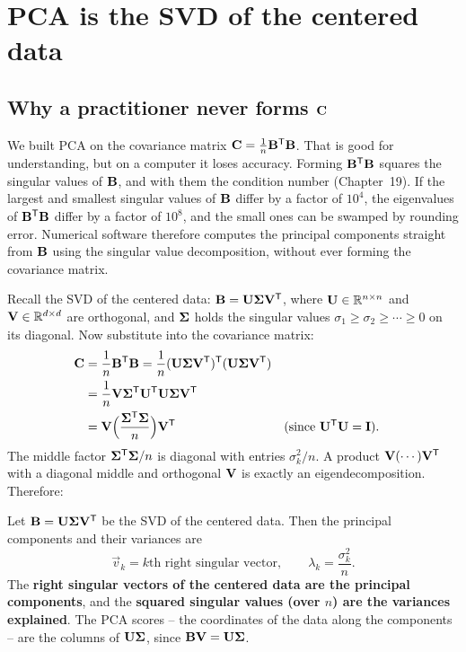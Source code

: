 \section{PCA is the SVD of the centered data}

\subsection{Why a practitioner never forms $\mathbf{C}$}

We built PCA on the covariance matrix $\mathbf{C}=\tfrac1n\mathbf{B}^{\mathsf{T}}\mathbf{B}$. That is
good for understanding, but on a computer it loses accuracy. Forming $\mathbf{B}^{\mathsf{T}}\mathbf{B}$
squares the singular values of $\mathbf{B}$, and with them the condition number
(Chapter~19). If the largest and smallest singular values of $\mathbf{B}$ differ by a
factor of $10^4$, the eigenvalues of $\mathbf{B}^{\mathsf{T}}\mathbf{B}$ differ by a factor of $10^8$,
and the small ones can be swamped by rounding error. Numerical software therefore
computes the principal components straight from $\mathbf{B}$ using the singular value
decomposition, without ever forming the covariance matrix.

Recall the SVD of the centered data: $\mathbf{B}=\mathbf{U}\mathbf{\Sigma}\mathbf{V}^{\mathsf{T}}$, where $\mathbf{U}\in\mathbb{R}^{n\times n}$ and $\mathbf{V}\in\mathbb{R}^{d\times d}$ are orthogonal, and $\mathbf{\Sigma}$
holds the singular values $\sigma_1\ge\sigma_2\ge\cdots\ge0$ on its diagonal. Now
substitute into the covariance matrix:
\begin{align*}
  \mathbf{C}&=\frac1n\mathbf{B}^{\mathsf{T}}\mathbf{B}
        =\frac1n(\mathbf{U}\mathbf{\Sigma}\mathbf{V}^{\mathsf{T}})^{\mathsf{T}}(\mathbf{U}\mathbf{\Sigma}\mathbf{V}^{\mathsf{T}})\\
        &=\frac1n\mathbf{V}\mathbf{\Sigma}^{\mathsf{T}}\mathbf{U}^{\mathsf{T}}\mathbf{U}\mathbf{\Sigma}\mathbf{V}^{\mathsf{T}}\\
        &=\mathbf{V}\Big(\frac{\mathbf{\Sigma}^{\mathsf{T}}\mathbf{\Sigma}}{n}\Big)\mathbf{V}^{\mathsf{T}}
        &&\text{(since $\mathbf{U}^{\mathsf{T}}\mathbf{U}=\mathbf{I}$)}.
\end{align*}
The middle factor $\mathbf{\Sigma}^{\mathsf{T}}\mathbf{\Sigma}/n$ is diagonal with entries
$\sigma_k^2/n$. A product $\mathbf{V}(\cdots)\mathbf{V}^{\mathsf{T}}$ with a diagonal middle and orthogonal
$\mathbf{V}$ is exactly an eigendecomposition. Therefore:

\begin{formalbox}\label{ch30:pca-svd}
Let $\mathbf{B}=\mathbf{U}\mathbf{\Sigma}\mathbf{V}^{\mathsf{T}}$ be the SVD of the centered data. Then the
principal components and their variances are
\[
  \boxed{\;\vec v_k = \text{$k$th right singular vector},
  \qquad
  \lambda_k=\frac{\sigma_k^2}{n}.\;}
\]
The \textbf{right singular vectors of the centered data are the principal
components}, and the \textbf{squared singular values (over $n$) are the variances
explained}. The PCA scores -- the coordinates of the data along the components --
are the columns of $\mathbf{U}\mathbf{\Sigma}$, since $\mathbf{B}\mathbf{V}=\mathbf{U}\mathbf{\Sigma}$.
\end{formalbox}

